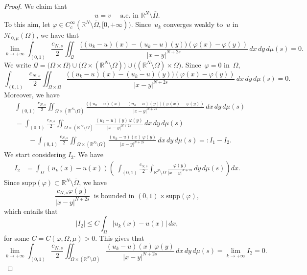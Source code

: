 \documentclass[12pt,a4paper,intlimits,sumlimits]{amsart}
\def \R {\mathbb{R}}
\def \Q {\mathcal Q}
\theoremstyle{definition}
\theoremstyle{plain}
\numberwithin{equation}{section}
\renewcommand{\le}{\leqslant}
\begin{document}
\begin{proof}
We claim that 
\begin{equation}\label{claimuv}
u=v \quad\mbox{ a.e. in } \R^N\setminus\overline\Omega.
\end{equation}
To this aim, let $\varphi\in C_c^\infty(\R^N\setminus \overline{\Omega}, [0,+\infty))$. Since~$u_k$ converges weakly to~$u$
in~${\mathcal H}_{0, \mu}(\Omega)$, we have that
\begin{equation}\label{limiteuv1}
\lim_{k\to +\infty}\int_{(0,1)}\frac{c_{N, s}}{2}\iint_\Q\frac{\big( (u_k-u)(x)- (u_k-u)(y)\big)(\varphi(x)-\varphi(y))}{|x-y|^{N+2s}}\,dx\,dy\,d\mu(s)=0.
\end{equation}
We write $\Q = \big(\Omega\times\Omega\big)\cup\big(\Omega\times(\R^N\setminus {\Omega})\big)\cup\big((\R^N\setminus  {\Omega})\times\Omega\big)$.  Since~$\varphi=0$ in~$\Omega$, 
\begin{equation}\label{limiteuv2}
\int_{(0,1)}\frac{c_{N, s}}{2}\iint_{\Omega\times\Omega}\frac{\big( (u_k-u)(x)- (u_k-u)(y)\big)(\varphi(x)-\varphi(y))}{|x-y|^{N+2s}}\,dx\,dy\,d\mu(s)=0.
\end{equation}
Moreover,  we have
\begin{equation}\label{limiteuv3}
\begin{split}
&\int_{(0,1)}\frac{c_{N, s}}{2}\iint_{\Omega\times(\R^N\setminus  {\Omega})}\frac{\big( (u_k-u)(x)- (u_k-u)(y)\big)(\varphi(x)-\varphi(y))}{|x-y|^{N+2s}}\,dx\,dy\,d\mu(s)\\
&= \int_{(0,1)}\frac{c_{N, s}}{2}\iint_{\Omega\times(\R^N\setminus  {\Omega})}\frac{(u_k-u)(y)\,\varphi(y)}{|x-y|^{N+2s}}\,dx\,dy\,d\mu(s)\\
&\qquad - \int_{(0,1)}\frac{c_{N, s}}{2}\iint_{\Omega\times(\R^N\setminus  {\Omega})}\frac{(u_k-u)(x)\,\varphi(y)}{|x-y|^{N+2s}}\,dx\,dy\,d\mu(s)=: I_1 - I_2.
\end{split}
\end{equation}
We start considering $I_2$.  We have
\[
\begin{split}
I_2&=\int_\Omega(u_k(x) - u(x)) \left(\;\int_{(0,1)}\frac{c_{N, s}}{2}\int_{\R^N\setminus \overline{\Omega}} \frac{\varphi(y)}{|x-y|^{N+2s}} \, dy\, d\mu(s) \right) dx.
\end{split}
\]
Since $\mbox{supp}(\varphi)\subset \R^N\setminus \overline{\Omega}$, we have
\[
\frac{c_{N, s}\varphi(y)}{|x-y|^{N+2s}} \ \mbox{ is bounded in } (0, 1)\times\mbox{supp}(\varphi),
\]
which entails that
\[
|I_2|\le C \int_\Omega |u_k(x) - u(x)|\, dx,
\]
for some $C=C(\varphi, \Omega, \mu)>0$. This gives that
\begin{equation}\label{limiteuv4}
\lim_{k\to +\infty}  \int_{(0,1)}\frac{c_{N, s}}{2}\iint_{\Omega\times(\R^N\setminus {\Omega})}\frac{(u_k-u)(x)\,\varphi(y)}{|x-y|^{N+2s}}\,dx\,dy\,d\mu(s) =\lim_{k\to+\infty} I_2 =0.
\end{equation}


\end{proof}
\end{document}

